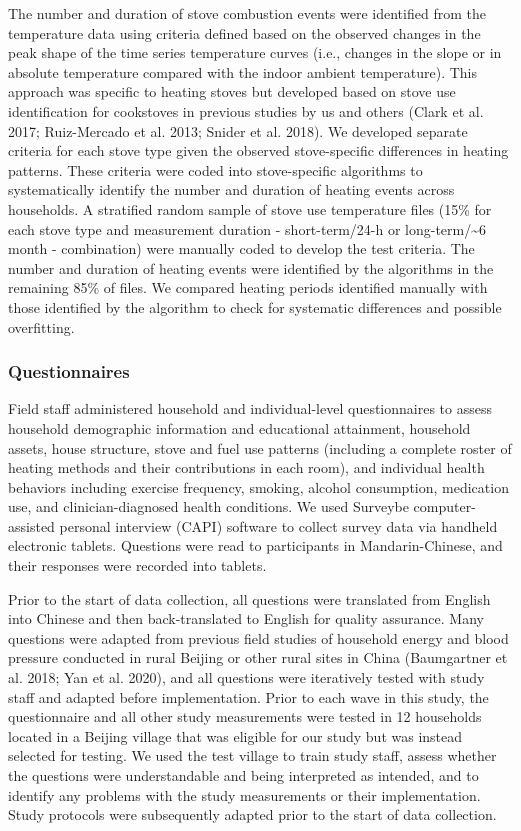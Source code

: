 \documentclass[
  letterpaper,
  DIV=11,
  numbers=noendperiod]{scrartcl}
\begin{document}
The number and duration of stove combustion events were identified from
the temperature data using criteria defined based on the observed
changes in the peak shape of the time series temperature curves (i.e.,
changes in the slope or in absolute temperature compared with the indoor
ambient temperature). This approach was specific to heating stoves but
developed based on stove use identification for cookstoves in previous
studies by us and others (Clark et al. 2017; Ruiz-Mercado et al. 2013;
Snider et al. 2018). We developed separate criteria for each stove type
given the observed stove-specific differences in heating patterns. These
criteria were coded into stove-specific algorithms to systematically
identify the number and duration of heating events across households. A
stratified random sample of stove use temperature files (15\% for each
stove type and measurement duration - short-term/24-h or
long-term/\textasciitilde6 month - combination) were manually coded to
develop the test criteria. The number and duration of heating events
were identified by the algorithms in the remaining 85\% of files. We
compared heating periods identified manually with those identified by
the algorithm to check for systematic differences and possible
overfitting.

\subsubsection{Questionnaires}\label{questionnaires}

Field staff administered household and individual-level questionnaires
to assess household demographic information and educational attainment,
household assets, house structure, stove and fuel use patterns
(including a complete roster of heating methods and their contributions
in each room), and individual health behaviors including exercise
frequency, smoking, alcohol consumption, medication use, and
clinician-diagnosed health conditions. We used Surveybe
computer-assisted personal interview (CAPI) software to collect survey
data via handheld electronic tablets. Questions were read to
participants in Mandarin-Chinese, and their responses were recorded into
tablets.

Prior to the start of data collection, all questions were translated
from English into Chinese and then back-translated to English for
quality assurance. Many questions were adapted from previous field
studies of household energy and blood pressure conducted in rural
Beijing or other rural sites in China (Baumgartner et al. 2018; Yan et
al. 2020), and all questions were iteratively tested with study staff
and adapted before implementation. Prior to each wave in this study, the
questionnaire and all other study measurements were tested in 12
households located in a Beijing village that was eligible for our study
but was instead selected for testing. We used the test village to train
study staff, assess whether the questions were understandable and being
interpreted as intended, and to identify any problems with the study
measurements or their implementation. Study protocols were subsequently
adapted prior to the start of data collection.
\end{document}
